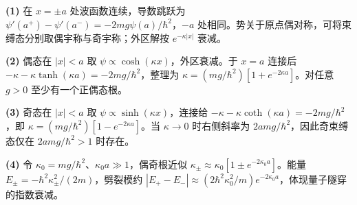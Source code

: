 \par\noindent\textbf{(1)} 在 \(x=\pm a\) 处波函数连续，导数跳跃为 \(\psi'(a^+)-\psi'(a^-)=-2mg\psi(a)/\hbar^2\)，\(-a\) 处相同。势关于原点偶对称，可将束缚态分别取偶宇称与奇宇称；外区解按 \(e^{-\kappa|x|}\) 衰减。
\par\noindent\textbf{(2)} 偶态在 \(|x|<a\) 取 \(\psi\propto\cosh(\kappa x)\)，外区衰减。于 \(x=a\) 连接后 \(-\kappa-\kappa\tanh(\kappa a)=-2mg/\hbar^2\)，整理为 \(\kappa=(mg/\hbar^2)[1+e^{-2\kappa a}]\)。对任意 \(g>0\) 至少有一个正偶态根。
\par\noindent\textbf{(3)} 奇态在 \(|x|<a\) 取 \(\psi\propto\sinh(\kappa x)\)，连接给 \(-\kappa-\kappa\coth(\kappa a)=-2mg/\hbar^2\)，即 \(\kappa=(mg/\hbar^2)[1-e^{-2\kappa a}]\)。当 \(\kappa\to0\) 时右侧斜率为 \(2amg/\hbar^2\)，因此奇束缚态仅在 \(2amg/\hbar^2>1\) 时存在。
\par\noindent\textbf{(4)} 令 \(\kappa_0=mg/\hbar^2\)、\(\kappa_0a\gg1\)，偶奇根近似 \(\kappa_\pm\approx\kappa_0[1\pm e^{-2\kappa_0a}]\)。能量 \(E_\pm=-\hbar^2\kappa_\pm^2/(2m)\)，劈裂模约 \(|E_+-E_-|\approx(2\hbar^2\kappa_0^2/m)e^{-2\kappa_0a}\)，体现量子隧穿的指数衰减。
